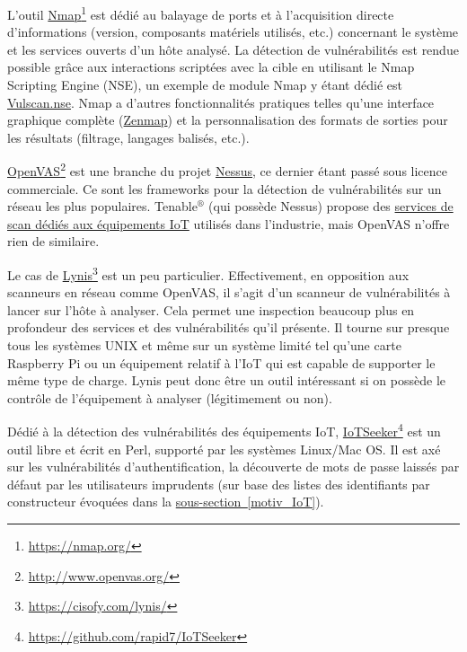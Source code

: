 \documentclass[]{article}
\newcommand{\wordlink}[2]{\hyperref[#1]{#2~\ref{#1}}}
\begin{document}
\par L'outil \href{https://nmap.org/}{Nmap}\footnote{\url{https://nmap.org/}} est dédié au balayage de ports et à l'acquisition directe d'informations (version, composants matériels utilisés, etc.) concernant le système et les services ouverts d'un hôte analysé. La détection de vulnérabilités est rendue possible grâce aux interactions scriptées avec la cible en utilisant le Nmap Scripting Engine (NSE), un exemple de module Nmap y étant dédié est \href{https://www.computec.ch/projekte/vulscan/}{Vulscan.nse}. Nmap a d'autres fonctionnalités pratiques telles qu'une interface graphique complète (\href{https://nmap.org/zenmap/}{Zenmap}) et la personnalisation des formats de sorties pour les résultats (filtrage, langages balisés, etc.).\\

\par \href{http://www.openvas.org/}{OpenVAS}\footnote{\url{http://www.openvas.org/}} est une branche du projet \href{https://www.tenable.com/products/nessus/nessus-professional}{Nessus}, ce dernier étant passé sous licence commerciale. Ce sont les frameworks pour la détection de vulnérabilités sur un réseau les plus populaires. Tenable$^{®}$ (qui possède Nessus) propose des \href{https://www.tenable.com/solutions/iot}{services de scan dédiés aux équipements IoT} utilisés dans l'industrie, mais OpenVAS n'offre rien de similaire.\\

\par Le cas de \href{https://cisofy.com/lynis/}{Lynis}\footnote{\url{https://cisofy.com/lynis/}} est un peu particulier. Effectivement, en opposition aux scanneurs en réseau comme OpenVAS, il s'agit d'un scanneur de vulnérabilités à lancer sur l'hôte à analyser. Cela permet une inspection beaucoup plus en profondeur des services et des vulnérabilités qu'il présente. Il tourne sur presque tous les systèmes UNIX et même sur un système limité tel qu'une carte Raspberry Pi ou un équipement relatif à l'IoT qui est capable de supporter le même type de charge. Lynis peut donc être un outil intéressant si on possède le contrôle de l'équipement à analyser (légitimement ou non).\\

\par Dédié à la détection des vulnérabilités des équipements IoT, \href{https://github.com/rapid7/IoTSeeker}{IoTSeeker}\footnote{\url{https://github.com/rapid7/IoTSeeker}} est un outil libre et écrit en Perl, supporté par les systèmes Linux/Mac OS. Il est axé sur les vulnérabilités d'authentification, la découverte de mots de passe laissés par défaut par les utilisateurs imprudents (sur base des listes des identifiants par constructeur évoquées dans la \wordlink{motiv_IoT}{sous-section}).\\
\end{document}
